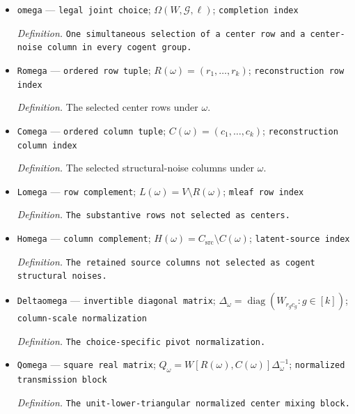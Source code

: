 \documentclass{article}
\begin{document}
\begin{itemize}
  \par\smallskip\noindent\emph{Definition.} The legal Algorithm-2 assignments \(\omega=((r_g,c_g))_{g=1}^{k}\) with \(r_g\in R_g\) and \(c_g\in K_g\), including every acyclicity, pivot, canonicality, and label constraint; each label in \(V_{\mathrm{fix}}(\mathcal G,\ell)\) remains a fixed singleton mleaf.
  \item \texttt{omega} --- \texttt{legal joint choice}; \(\Omega(W,\mathcal G,\ell)\); \texttt{completion index}
  \par\smallskip\noindent\emph{Definition.} \texttt{One simultaneous selection of a center row and a center-\allowbreak{}noise column in every cogent group.}
  \item \texttt{Romega} --- \texttt{ordered row tuple}; \(R(\omega)=(r_1,\ldots,r_k)\); \texttt{reconstruction row index}
  \par\smallskip\noindent\emph{Definition.} The selected center rows under \(\omega\).
  \item \texttt{Comega} --- \texttt{ordered column tuple}; \(C(\omega)=(c_1,\ldots,c_k)\); \texttt{reconstruction column index}
  \par\smallskip\noindent\emph{Definition.} The selected structural-noise columns under \(\omega\).
  \item \texttt{Lomega} --- \texttt{row complement}; \(L(\omega)=V\setminus R(\omega)\); \texttt{mleaf row index}
  \par\smallskip\noindent\emph{Definition.} \texttt{The substantive rows not selected as centers.}
  \item \texttt{Homega} --- \texttt{column complement}; \(H(\omega)=C_{\mathrm{src}}\setminus C(\omega)\); \texttt{latent-\allowbreak{}source index}
  \par\smallskip\noindent\emph{Definition.} \texttt{The retained source columns not selected as cogent structural noises.}
  \item \texttt{Deltaomega} --- \texttt{invertible diagonal matrix}; \(\Delta_{\omega}=\operatorname{diag}(W_{r_g c_g}:g\in[k])\); \texttt{column-\allowbreak{}scale normalization}
  \par\smallskip\noindent\emph{Definition.} \texttt{The choice-\allowbreak{}specific pivot normalization.}
  \item \texttt{Qomega} --- \texttt{square real matrix}; \(Q_{\omega}=W[R(\omega),C(\omega)]\Delta_{\omega}^{-1}\); \texttt{normalized transmission block}
  \par\smallskip\noindent\emph{Definition.} \texttt{The unit-\allowbreak{}lower-\allowbreak{}triangular normalized center mixing block.}

\end{itemize}
\end{document}
